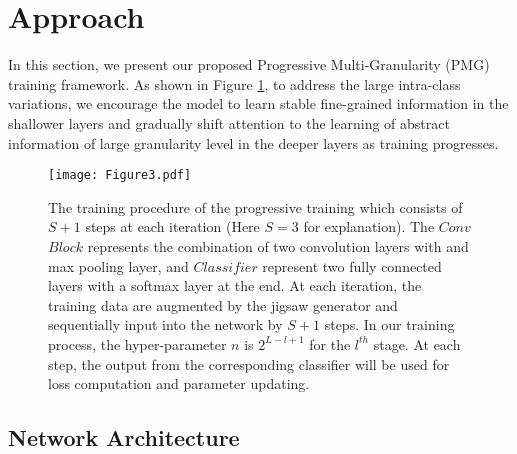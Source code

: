\documentclass{llncs}
\begin{document}
\section{Approach}

In this section, we present our proposed Progressive Multi-Granularity (PMG) training framework. As shown in Figure \ref{fig:network_train}, to address the large intra-class variations, we encourage the model to learn stable fine-grained information in the shallower layers and gradually shift attention to the learning of abstract information of large granularity level in the deeper layers as training progresses. 












\begin{figure}[!t]
\centering
\texttt{[image: Figure3.pdf]}
\caption{
The training procedure of the progressive training which consists of $S+1$ steps at each iteration (Here $S=3$ for explanation). The $Conv$ $Block$ represents the combination of two convolution layers with and max pooling layer, and $Classifier$ represent two fully connected layers with a softmax layer at the end. At each iteration, the training data are augmented by the jigsaw generator and sequentially input into the network by $S+1$ steps. In our training process, the hyper-parameter $n$ is $2^{L-l+1}$ for the $l^{th}$ stage. At each step, the output from the corresponding classifier will be used for loss computation and parameter updating.
}
\label{fig:network_train}
\end{figure}

\subsection{Network Architecture}
\end{document}
